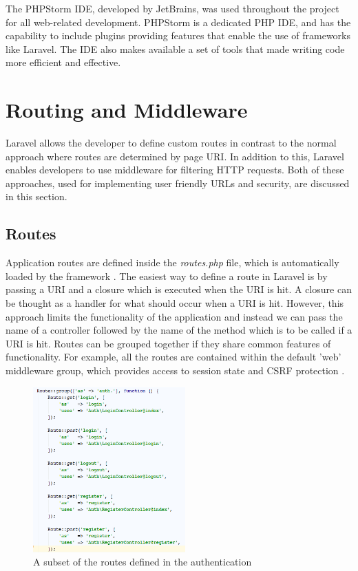 The PHPStorm IDE, developed by JetBrains, was used throughout the project for all web-related development. PHPStorm is a dedicated PHP IDE, and has the capability to include plugins providing features that enable the use of frameworks like Laravel. The IDE also makes available a set of tools that made writing code more efficient and effective. 

\section{Routing and Middleware}
Laravel allows the developer to define custom routes in contrast to the normal approach where routes are determined by page URI. In addition to this, Laravel enables developers to use middleware for filtering HTTP requests. Both of these approaches, used for implementing user friendly URLs and security, are discussed in this section.

\subsection{Routes}
Application routes are defined inside the \textit{routes.php} file, which is automatically loaded by the framework \cite{Laravel:Routing}. The easiest way to define a route in Laravel is by passing a URI and a closure which is executed when the URI is hit. A closure can be thought as a handler for what should occur when a URI is hit. However, this approach limits the functionality of the application and instead we can pass the name of a controller followed by the name of the method which is to be called if a URI is hit. Routes can be grouped together if they share common features of functionality. For example, all the routes are contained within the default 'web' middleware group, which provides access to session state and CSRF protection \cite{Laravel:Routing}.

\begin{figure}[H]
	\centering
	\includegraphics[height=2.5in]{Images/Implementation/LaravelRouting}
	\caption{A subset of the routes defined in the authentication} \label{fig:Routes}
\end{figure}

